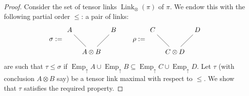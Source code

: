 \documentclass[12pt]{article}
\theoremstyle{plain}
\theoremstyle{definition}
\begin{document}
\begin{proof}
Consider the set of tensor links $\operatorname{Link}_{\otimes}(\pi)$ of $\pi$. We endow this with the following partial order $\leq$: a pair of links:
\[
\sigma := 
\begin{tikzcd}[column sep = tiny]
A\arrow[dr,dash] && B\arrow[dl,dash]\\
& A \otimes B
\end{tikzcd}
%
\qquad
%
\rho :=
\begin{tikzcd}[column sep = tiny]
C\arrow[dr,dash] && D\arrow[dl,dash]\\
& C \otimes D
\end{tikzcd}
\]
are such that $\tau \leq \sigma$ if $\operatorname{Emp}_{\uparrow}A \cup \operatorname{Emp}_{\uparrow}B \subseteq \operatorname{Emp}_{\uparrow}C \cup \operatorname{Emp}_{\uparrow}D$. Let $\tau$ (with conclusion $A \otimes B$ say) be a tensor link maximal with respect to $\leq$. We show that $\tau$ satisfies the required property.


\end{proof}
\end{document}
